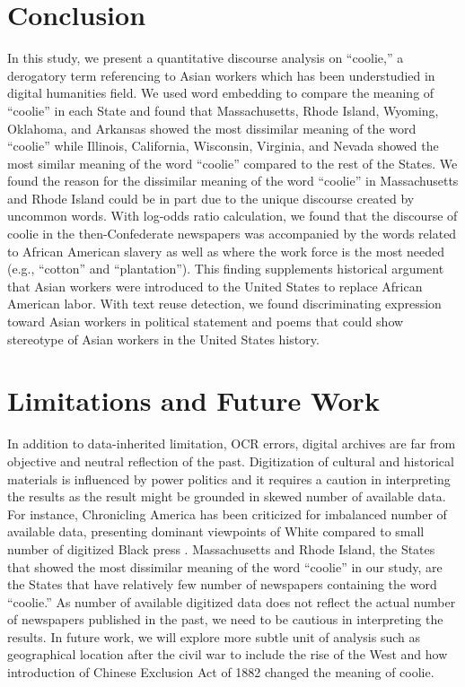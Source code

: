 \documentclass[11pt]{article}
\begin{document}
\section{Conclusion} \label{sec:conclusion}
In this study, we present a quantitative discourse analysis on ``coolie,'' 
a derogatory term referencing to Asian workers
which has been understudied in digital humanities field.
We used word embedding to compare the meaning of ``coolie'' in each State
and found that Massachusetts, Rhode Island, Wyoming, Oklahoma, and Arkansas
showed the most dissimilar meaning of the word ``coolie'' while Illinois, California, Wisconsin, Virginia, and Nevada
showed the most similar meaning of the word ``coolie'' compared to the rest of the States. 
We found the reason for the dissimilar meaning of the word ``coolie'' in Massachusetts and Rhode Island
could be in part due to the unique discourse created by uncommon words. 
With log-odds ratio calculation, we found that the discourse of coolie in the then-Confederate newspapers
was accompanied by the words related to African American slavery as well as where the 
work force is the most needed (e.g., ``cotton'' and ``plantation''). This finding supplements
historical argument that Asian workers were introduced to the United States to replace African American labor.
With text reuse detection, we found discriminating expression toward Asian workers 
in political statement and poems that could show stereotype of Asian workers in the United States history. 

\section{Limitations and Future Work} \label{sec:limitations}
In addition to data-inherited limitation, OCR errors, 
digital archives are far from objective and neutral reflection of the past. 
Digitization of cultural and historical materials is influenced by power politics 
and it requires a caution in interpreting the results \cite{zaagsma2023digital} as the result might be grounded
in skewed number of available data. 
For instance, Chronicling America has been criticized for
imbalanced number of available data, presenting dominant viewpoints of White compared 
to small number of digitized Black press \cite{fagan2016chronicling}. 
Massachusetts and Rhode Island, the States that showed the most dissimilar meaning of the word ``coolie''
in our study, are the States that have relatively few number of newspapers containing the word ``coolie.''
As number of available digitized data does not reflect the actual number of newspapers published in the past,
we need to be cautious in interpreting the results.
In future work, we will explore more subtle unit of analysis such as geographical location after 
the civil war to include the rise of the West and how introduction of Chinese Exclusion Act of 1882
changed the meaning of coolie. 





\end{document}
